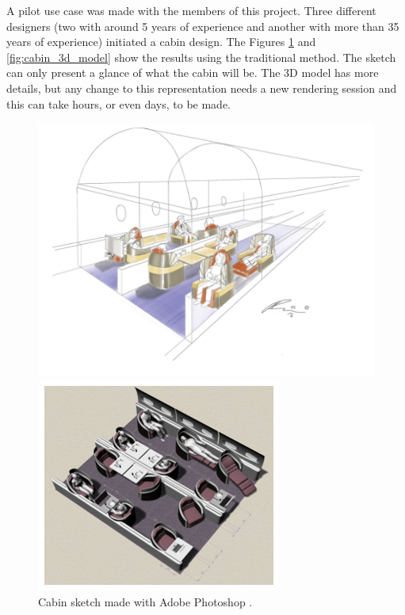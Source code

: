 A pilot use case was made with the members of this project. Three different designers (two with around 5 years of experience and another with more than 35 years of experience) initiated a cabin design. 
The Figures \ref{fig:cabin_sketch} and \ref{fig:cabin_3d_model} show the results using the traditional method. The sketch can only present a glance of what the cabin will be. The 3D model has more details, but any change to this representation needs a new rendering session and this can take hours, or even days, to be made.

\begin{figure}[h]
\centering
\begin{minipage}{.45\textwidth}
    \centering
    \includegraphics[width = \linewidth]{Revisao/VR Cabin/Sketch.png}
    \vspace{0.4cm}
    \caption{Cabin sketch made with Adobe Photoshop \cite{moerland2021application}.}
    \label{fig:cabin_sketch}
\end{minipage}
\hfil
\begin{minipage}{.45\textwidth}
    \centering
    \includegraphics[width = \linewidth]{Revisao/VR Cabin/3D Model.png}

\end{minipage}
\end{figure}

